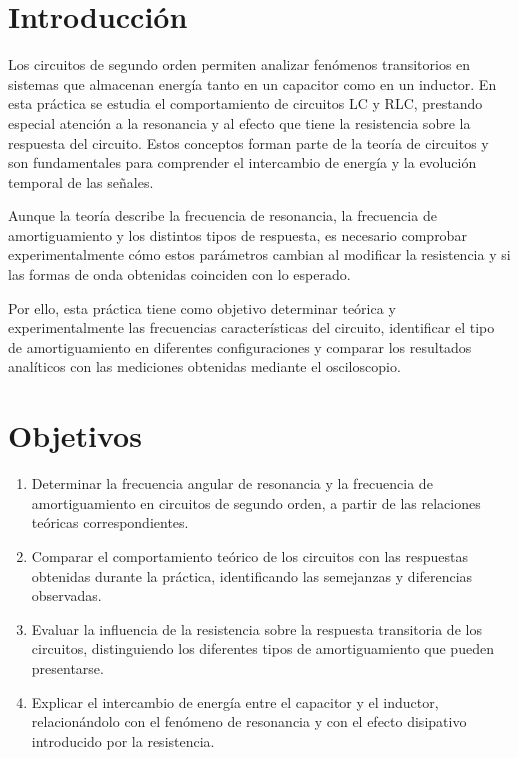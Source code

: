 \documentclass{article}
\begin{document}
    \section{Introducción}

    Los circuitos de segundo orden permiten analizar fenómenos transitorios en sistemas que almacenan energía tanto en un capacitor como en un inductor. En esta práctica se estudia el comportamiento de circuitos LC y RLC, prestando especial atención a la resonancia y al efecto que tiene la resistencia sobre la respuesta del circuito. Estos conceptos forman parte de la teoría de circuitos y son fundamentales para comprender el intercambio de energía y la evolución temporal de las señales.

    Aunque la teoría describe la frecuencia de resonancia, la frecuencia de amortiguamiento y los distintos tipos de respuesta, es necesario comprobar experimentalmente cómo estos parámetros cambian al modificar la resistencia y si las formas de onda obtenidas coinciden con lo esperado.

    Por ello, esta práctica tiene como objetivo determinar teórica y experimentalmente las frecuencias características del circuito, identificar el tipo de amortiguamiento en diferentes configuraciones y comparar los resultados analíticos con las mediciones obtenidas mediante el osciloscopio.


    \section{Objetivos}

    \begin{enumerate}
        \item Determinar la frecuencia angular de resonancia y la frecuencia de amortiguamiento en circuitos de segundo orden, a partir de las relaciones teóricas correspondientes.
        \item Comparar el comportamiento teórico de los circuitos con las respuestas obtenidas durante la práctica, identificando las semejanzas y diferencias observadas.
        \item Evaluar la influencia de la resistencia sobre la respuesta transitoria de los circuitos, distinguiendo los diferentes tipos de amortiguamiento que pueden presentarse.
        \item Explicar el intercambio de energía entre el capacitor y el inductor, relacionándolo con el fenómeno de resonancia y con el efecto disipativo introducido por la resistencia.
    \end{enumerate}
\end{document}

